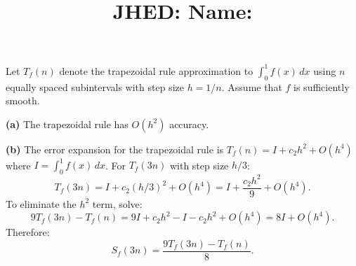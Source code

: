 \documentclass[reqno, answers]{exam}
\title{\normalsize{
  JHED: \underline{\hspace{4cm}} \hspace{1em} Name: \underline{\hspace{9cm}}}
   }
\author{}
\date{}
\begin{document}
\maketitle
\vspace{-2cm} %

\begin{questions}
  \question

  Let $T_f(n)$ denote the trapezoidal rule approximation to $\int_0^1 f(x) \, dx$ using $n$ equally spaced subintervals with step size $h = 1/n$. Assume that $f$ is sufficiently smooth.


\begin{solution}
\textbf{(a)} The trapezoidal rule has $O(h^2)$ accuracy.

\textbf{(b)} The error expansion for the trapezoidal rule is $T_f(n) = I + c_2h^2 + O(h^4)$ where $I = \int_0^1 f(x)\,dx$. For $T_f(3n)$ with step size $h/3$:
$$T_f(3n) = I + c_2(h/3)^2 + O(h^4) = I + \frac{c_2h^2}{9} + O(h^4).$$
To eliminate the $h^2$ term, solve:
$$9T_f(3n) - T_f(n) = 9I + c_2h^2 - I - c_2h^2 + O(h^4) = 8I + O(h^4).$$
Therefore:
$$S_f(3n) = \frac{9T_f(3n) - T_f(n)}{8}.$$


\end{solution}
\end{questions}
\end{document}
